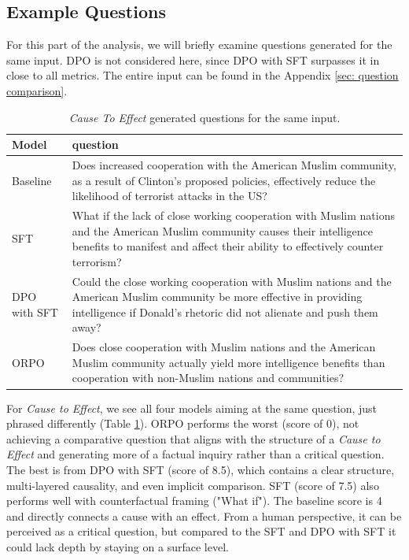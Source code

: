 \documentclass[11pt]{article}
\begin{document}
\subsection{Example Questions}
For this part of the analysis, we will briefly examine questions generated for the same input. DPO is not considered here, since DPO with SFT surpasses it in close to all metrics. The entire input can be found in the Appendix \ref{sec: question comparison}.
\begin{table} [H]
    \centering
    \begin{tabular}{p{1.4cm}p{5.5cm}}
    \hline
    \textbf{Model} & \textbf{question}\\
    \hline
     Baseline & Does increased cooperation with the American Muslim community, as a result of Clinton's proposed policies, effectively reduce the likelihood of terrorist attacks in the US?\\
     SFT & What if the lack of close working cooperation with Muslim nations and the American Muslim community causes their intelligence benefits to manifest and affect their ability to effectively counter terrorism? \\
     DPO with SFT & Could the close working cooperation with Muslim nations and the American Muslim community be more effective in providing intelligence if Donald's rhetoric did not alienate and push them away?\\
     ORPO & Does close cooperation with Muslim nations and the American Muslim community actually yield more intelligence benefits than cooperation with non-Muslim nations and communities? \\
    \end{tabular}
    \caption{\textit{Cause To Effect} generated questions for the same input.}
    \label{tab: example generated questions cause}
\end{table}
For \textit{Cause to Effect}, we see all four models aiming at the same question, just phrased differently (Table \ref{tab: example generated questions cause}). ORPO performs the worst (score of 0), not achieving a comparative question that aligns with the structure of a \textit{Cause to Effect} and generating more of a factual inquiry rather than a critical question. The best is from DPO with SFT (score of 8.5), which contains a clear structure, multi-layered causality, and even implicit comparison. SFT (score of 7.5) also performs well with counterfactual framing ("What if"). The baseline score is 4 and directly connects a cause with an effect. From a human perspective, it can be perceived as a critical question, but compared to the SFT and DPO with SFT it could lack depth by staying on a surface level.
\end{document}
